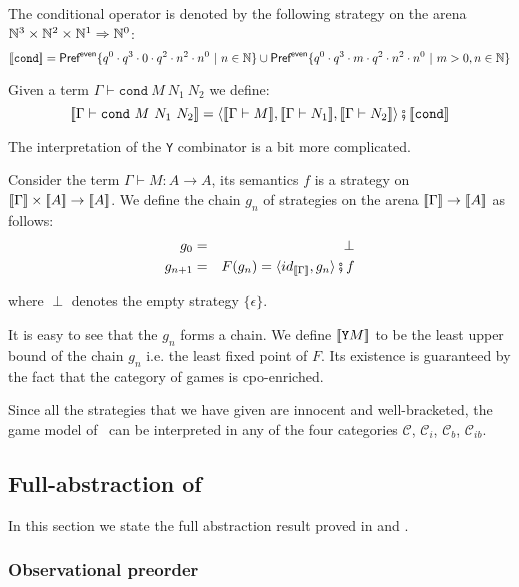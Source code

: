   
The conditional operator is denoted by the following strategy on the
arena $\mathbb{N}^3 \times \mathbb{N}^2 \times \mathbb{N} ^1 \Rightarrow \mathbb{N}^0$:
$${[\![ \texttt{cond} ]\!]} = \textsf{Pref}^{\sf even} 
    \{ q^0 \cdot q^3 \cdot 0 \cdot q^2 \cdot n^2 \cdot n^0 \ | \ n \in \mathbb{N} \}
    \cup
    \textsf{Pref}^{\sf even}  \{ q^0 \cdot q^3 \cdot m \cdot q^2 \cdot n^2 \cdot n^0 \ | \ m >0, n \in \mathbb{N} \}
    $$


Given a term $\Gamma \vdash \texttt{cond}\ M\ N_1\ N_2$ we define:
$$\sem{\Gamma \vdash \texttt{cond}\ M\ N_1\ N_2} =
\langle \sem{\Gamma \vdash M}, \sem{\Gamma \vdash N_1}, \sem{\Gamma
\vdash N_2} \rangle \fatsemi \sem{\texttt{cond}}$$


The interpretation of the \texttt{Y} combinator is a bit more
complicated.

Consider the term $\Gamma \vdash M : A \rightarrow A$, its semantics
$f$ is a strategy on ${[\![ \Gamma ]\!]} \times {[\![A ]\!]} \rightarrow
{[\![A ]\!]}$. We define the chain $g_n$ of strategies on the arena
${[\![ \Gamma ]\!]} \rightarrow {[\![A ]\!]}$ as follows:
\begin{eqnarray*}
g_0 &=& \perp \\
g_{n+1} &=&  F(g_n) = \langle id_{{[\![ \Gamma ]\!]}}, g_n\rangle \fatsemi f
\end{eqnarray*}

where $\perp$ denotes the empty strategy $\{ \epsilon \}$.

It is easy to see that the $g_n$ forms a chain. We define
${[\![ \texttt{Y} M ]\!]}$ to be the least upper bound of the chain $g_n$
i.e. the  least fixed point of $F$. Its existence is guaranteed by
the fact that the category of games is cpo-enriched.

Since all the strategies that we have given are innocent and
well-bracketed, the game model of \pcf\ can be interpreted in any of
the four categories $\mathcal{C}$, $\mathcal{C}_i$, $\mathcal{C}_b$,
$\mathcal{C}_{ib}$.



\subsection{Full-abstraction of \pcf}
In this section we state the full abstraction result proved in
\cite{abramsky94full} and \cite{hylandong_pcf}.


\subsubsection{Observational preorder}

